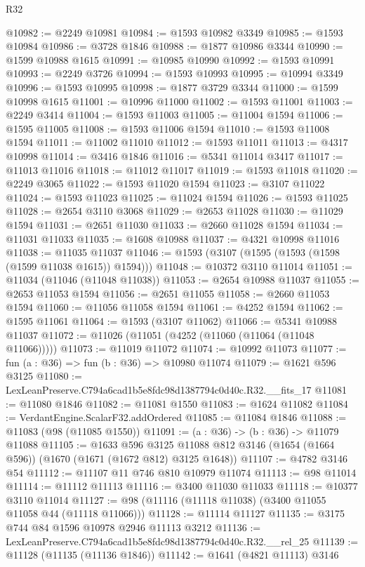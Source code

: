 \begin{lexlean}{R32}
\begin{coremodule}
@10982 := @2249 @10981
@10984 := @1593 @10982 @3349
@10985 := @1593 @10984
@10986 := @3728 @1846
@10988 := @1877 @10986 @3344
@10990 := @1599 @10988 @1615
@10991 := @10985 @10990
@10992 := @1593 @10991
@10993 := @2249 @3726
@10994 := @1593 @10993
@10995 := @10994 @3349
@10996 := @1593 @10995
@10998 := @1877 @3729 @3344
@11000 := @1599 @10998 @1615
@11001 := @10996 @11000
@11002 := @1593 @11001
@11003 := @2249 @3414
@11004 := @1593 @11003
@11005 := @11004 @1594
@11006 := @1595 @11005
@11008 := @1593 @11006 @1594
@11010 := @1593 @11008 @1594
@11011 := @11002 @11010
@11012 := @1593 @11011
@11013 := @4317 @10998
@11014 := @3416 @1846
@11016 := @5341 @11014 @3417
@11017 := @11013 @11016
@11018 := @11012 @11017
@11019 := @1593 @11018
@11020 := @2249 @3065
@11022 := @1593 @11020 @1594
@11023 := @3107 @11022
@11024 := @1593 @11023
@11025 := @11024 @1594
@11026 := @1593 @11025
@11028 := @2654 @3110 @3068
@11029 := @2653 @11028
@11030 := @11029 @1594
@11031 := @2651 @11030
@11033 := @2660 @11028 @1594
@11034 := @11031 @11033
@11035 := @1608 @10988
@11037 := @4321 @10998 @11016
@11038 := @11035 @11037
@11046 := @1593 (@3107 (@1595 (@1593 (@1598 (@1599 @11038 @1615)) @1594)))
@11048 := @10372 @3110 @11014
@11051 := @11034 (@11046 (@11048 @11038))
@11053 := @2654 @10988 @11037
@11055 := @2653 @11053 @1594
@11056 := @2651 @11055
@11058 := @2660 @11053 @1594
@11060 := @11056 @11058 @1594
@11061 := @4252 @1594
@11062 := @1595 @11061
@11064 := @1593 (@3107 @11062)
@11066 := @5341 @10988 @11037
@11072 := @11026 (@11051 (@4252 (@11060 (@11064 (@11048 @11066)))))
@11073 := @11019 @11072
@11074 := @10992 @11073
@11077 := fun (a : @36) => fun (b : @36) => @10980 @11074
@11079 := @1621 @596 @3125
@11080 := LexLeanPreserve.C794a6cad1b5e8fdc98d1387794c0d40c.R32.__fits_17
@11081 := @11080 @1846
@11082 := @11081 @1550
@11083 := @1624 @11082
@11084 := VerdantEngine.ScalarF32.addOrdered
@11085 := @11084 @1846
@11088 := @11083 (@98 (@11085 @1550))
@11091 := (a : @36) -> (b : @36) -> @11079 @11088
@11105 := @1633
    @596
    @3125
    @11088
    @812
    @3146
    (@1654 (@1664 @596))
    (@1670 (@1671 (@1672 @812) @3125 @1648))
@11107 := @4782 @3146 @54
@11112 := @11107 @11 @746 @810 @10979 @11074
@11113 := @98 @11014
@11114 := @11112 @11113
@11116 := @3400 @11030 @11033
@11118 := @10377 @3110 @11014
@11127 := @98 (@11116 (@11118 @11038) (@3400 @11055 @11058 @44 (@11118 @11066)))
@11128 := @11114 @11127
@11135 := @3175 @744 @84 @1596 @10978 @2946 @11113 @3212
@11136 := LexLeanPreserve.C794a6cad1b5e8fdc98d1387794c0d40c.R32.__rel_25
@11139 := @11128 (@11135 (@11136 @1846))
@11142 := @1641 (@4821 @11113) @3146

\end{coremodule}
\end{lexlean}
